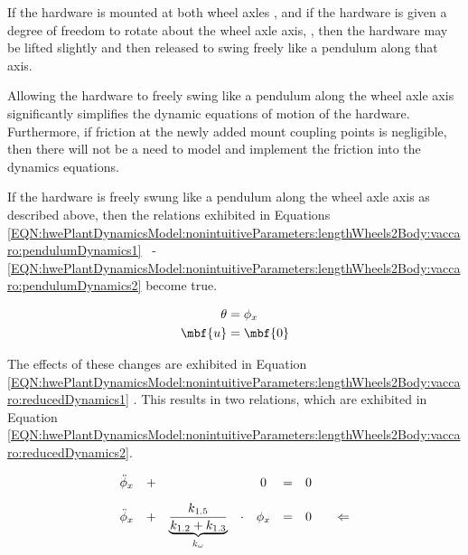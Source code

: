 \documentclass[crop=false,float=true,class=scrreprt]{standalone}
\begin{document}
If the hardware is mounted at both wheel axles 
,
and if the hardware is given a degree of freedom to rotate about the wheel axle axis,
,
then the hardware may be lifted slightly and then released 
to swing freely {\fns like a pendulum} along that axis.

Allowing the hardware to freely swing like a pendulum along the wheel axle axis
significantly simplifies the dynamic equations of motion of the hardware.
Furthermore, if friction at the newly added mount coupling points is negligible,
then there will not be a need to model and implement the friction into the dynamics equations.

If the hardware is freely swung like a pendulum along the wheel axle axis as described above,
then the relations exhibited in Equations
\eqref{EQN:hwePlantDynamicsModel:nonintuitiveParameters:lengthWheels2Body:vaccaro:pendulumDynamics1}~%
-~%
\eqref{EQN:hwePlantDynamicsModel:nonintuitiveParameters:lengthWheels2Body:vaccaro:pendulumDynamics2}
become true.


\vspace{-3em}

\begin{align}
\label{EQN:hwePlantDynamicsModel:nonintuitiveParameters:lengthWheels2Body:vaccaro:pendulumDynamics1}
\theta  &= \phi_{x} \\[+0em]
\label{EQN:hwePlantDynamicsModel:nonintuitiveParameters:lengthWheels2Body:vaccaro:pendulumDynamics2}
\mbf{u} &= \mbf{0}
\end{align}

\vspace{-1em}

The effects of these changes are exhibited in Equation~%
\eqref{EQN:hwePlantDynamicsModel:nonintuitiveParameters:lengthWheels2Body:vaccaro:reducedDynamics1}
{}.
This results in two relations, which are exhibited in Equation~%
\eqref{EQN:hwePlantDynamicsModel:nonintuitiveParameters:lengthWheels2Body:vaccaro:reducedDynamics2}.

\vspace{-0em}

\begin{equation}
\label{EQN:hwePlantDynamicsModel:nonintuitiveParameters:lengthWheels2Body:vaccaro:reducedDynamics2}
\begin{array}{ccccccccc}
\ddot{\phi}_{x}
& + &
&&
0
& = &
0
\\[+1em]
\ddot{\phi}_{x}
& + &
\displaystyle\frac{k_{1.5}}{k_{1.2} + k_{1.3}}
& \cdot &
\phi_{x}
& = &
0
&&
\Leftarrow
\\[-1em]
&&
\underbrace{
\hphantom{
\displaystyle\frac{k_{1.5}}{k_{1.2} + k_{1.3}}
}
}_{k_{\omega}}
\end{array}
\end{equation}
\end{document}

